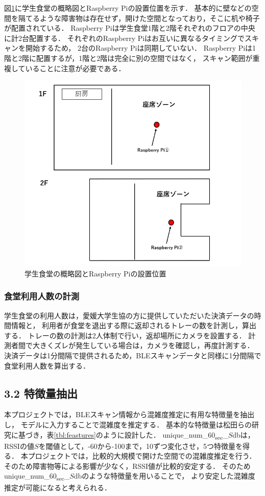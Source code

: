図\ref{raspi_place}に学生食堂の概略図とRaspberry Piの設置位置を示す．
基本的に壁などの空間を隔てるような障害物は存在せず，開けた空間となっており，そこに机や椅子が配置されている．
Raspberry Piは学生食堂1階と2階それぞれのフロアの中央に計2台配置する．
それぞれのRaspberry Piはお互いに異なるタイミングでスキャンを開始するため，
2台のRaspberry Piは同期していない．
Raspberry Piは1階と2階に配置するが，1階と2階は完全に別の空間ではなく，
スキャン範囲が重複していることに注意が必要である．
\begin{figure}[pt]
  \includegraphics[scale=0.6]{./images/raspi_place.png}
  \centering
  \caption{学生食堂の概略図とRaspberry Piの設置位置\label{raspi_place}}
\end{figure}

\subsubsection*{食堂利用人数の計測}
学生食堂の利用人数は，愛媛大学生協の方に提供していただいた決済データの時間情報と，
利用者が食堂を退出する際に返却されるトレーの数を計測し，算出する．
トレーの数の計測は2人体制で行い，返却場所にカメラを設置する．
計測者間で大きくズレが発生している場合は，カメラを確認し，再度計測する．
決済データは1分間隔で提供されるため，BLEスキャンデータと同様に1分間隔で食堂利用人数を算出する．

\subsection*{3.2 特徴量抽出}
本プロジェクトでは，BLEスキャン情報から混雑度推定に有用な特徴量を抽出し，
モデルに入力することで混雑度を推定する．
基本的な特徴量は松田らの研究\cite{senkou}に基づき，表\ref{tbl:feastures}のように設計した．
unique\_num\_60\textsubscript{sec}\_$S$dbは，
RSSIの値$S$を閾値として，-60から-100まで，10ずつ変化させ，5つ特徴量を得る．
本プロジェクトでは，比較的大規模で開けた空間での混雑度推定を行う．
そのため障害物等による影響が少なく，RSSI値が比較的安定する．
そのためunique\_num\_60\textsubscript{sec}\_$S$dbのような特徴量を用いることで，
より安定した混雑度推定が可能になると考えられる．


